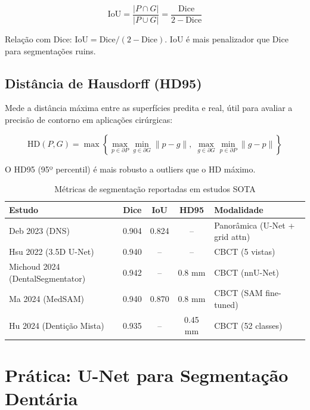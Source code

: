 \begin{equation}
  \text{IoU} = \frac{|P \cap G|}{|P \cup G|} = \frac{\text{Dice}}{2 - \text{Dice}}
  \label{eq:iou}
\end{equation}

Relação com Dice: $\text{IoU} = \text{Dice} / (2 - \text{Dice})$.
IoU é mais penalizador que Dice para segmentações ruins.

\subsection{Distância de Hausdorff (HD95)}

Mede a distância máxima entre as superfícies predita e real, útil para avaliar
a precisão de contorno em aplicações cirúrgicas:

\begin{equation}
  \text{HD}(P, G) = \max\left\{
    \max_{p \in \partial P} \min_{g \in \partial G} \|p - g\|,\;
    \max_{g \in \partial G} \min_{p \in \partial P} \|g - p\|
  \right\}
  \label{eq:hausdorff}
\end{equation}

O HD95 (95º percentil) é mais robusto a outliers que o HD máximo.

\begin{table}[H]
  \centering
  \caption{Métricas de segmentação reportadas em estudos SOTA}
  \label{tab:seg-metrics}
  \begin{tabularx}{\textwidth}{lcccX}
    \toprule
    \textbf{Estudo} & \textbf{Dice} & \textbf{IoU} & \textbf{HD95} & \textbf{Modalidade} \\
    \midrule
    Deb 2023 (DNS) & 0.904 & 0.824 & -- & Panorâmica (U-Net + grid attn) \\
    Hsu 2022 (3.5D U-Net) & 0.940 & -- & -- & CBCT (5 vistas) \\
    Michoud 2024 (DentalSegmentator) & 0.942 & -- & 0.8 mm & CBCT (nnU-Net) \\
    Ma 2024 (MedSAM) & 0.940 & 0.870 & 0.8 mm & CBCT (SAM fine-tuned) \\
    Hu 2024 (Dentição Mista) & 0.935 & -- & 0.45 mm & CBCT (52 classes) \\
    \bottomrule
  \end{tabularx}
\end{table}

\section{Prática: U-Net para Segmentação Dentária}
\label{sec:pratica-unet}

